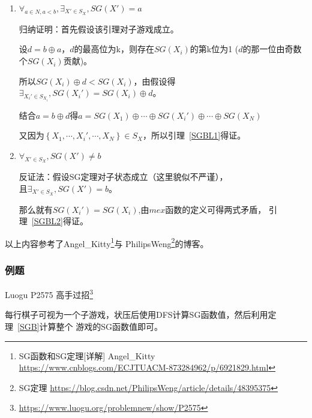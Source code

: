 \begin{enumerate}
	\item
	      \begin{lemma}\label{SGBL1}
		      $\forall_{a\in N,a<b},\exists_{X'\in S_X},SG(X')=a$
	      \end{lemma}

	      归纳证明：首先假设该引理对子游戏成立。

	      设$d=b\oplus a$，$d$的最高位为k，则存在$SG(X_i)$的第k位为1
	      ($d$的那一位由奇数个$SG(X_i)$贡献)。

	      所以$SG(X_i)\oplus d<SG(X_i)$，由假设得$\exists_{X_i'\in
			      S_{X_i}},SG(X_i')=SG(X_i)\oplus d$。

	      结合$a=b\oplus d$得$a=SG(X_1)\oplus \cdots \oplus SG(X_i')
		      \oplus \cdots \oplus SG(X_N)$

	      又因为$\left\{X_1,\cdots,X_i',\cdots,X_N\right\}\in S_X$，所以引理~\ref{SGBL1}得证。

	\item
	      \begin{lemma}\label{SGBL2}
		      $\forall_{X'\in S_X},SG(X')\not=b$
	      \end{lemma}

	      反证法：假设SG定理对子状态成立（这里貌似不严谨），\\且$\exists_{X' \in S_X},SG(X')=b$。

	      那么就有$SG(X_i')=SG(X_i)$,由$mex$函数的定义可得两式矛盾，
		  引理~\ref{SGBL2}得证。

\end{enumerate}

以上内容参考了Angel\_Kitty\footnote{SG函数和SG定理[详解] Angel\_Kitty
\url{https://www.cnblogs.com/ECJTUACM-873284962/p/6921829.html}}与
PhilipsWeng\footnote{SG定理
	\url{https://blog.csdn.net/PhilipsWeng/article/details/48395375}}的博客。

\subsubsection{例题}

Luogu P2575 高手过招\footnote{\url{https://www.luogu.org/problemnew/show/P2575}}

每行棋子可视为一个子游戏，状压后使用DFS计算SG函数值，然后利用定理~\ref{SGB}计算整个
游戏的SG函数值即可。


